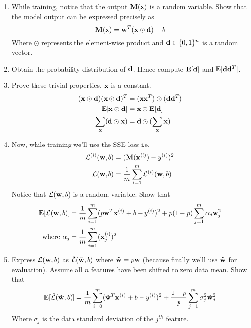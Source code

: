 \begin{enumerate}[label=\alph*)]

\item While training, notice that the output $\mathbf{M}(\mathbf{x})$ is a random variable. Show that the model output can be expressed precisely as
    \begin{equation*}
        \mathbf{M}(\mathbf{x}) = \mathbf{w}^T (\mathbf{x} \odot \mathbf{d}) + b
    \end{equation*}
Where  $\odot$ represents the element-wise product and $\mathbf{d} \in \{0, 1\}^n$ is a random vector.  

\item Obtain the probability distribution of $\mathbf{d}$. Hence compute $\mathbf{E}[\mathbf{d}]$ and $\mathbf{E}[\mathbf{d}\mathbf{d}^T]$.

\item Prove these trivial properties, $\mathbf{x}$  is a constant.
\begin{align*}
    (\mathbf{x} \odot \mathbf{d})  (\mathbf{x} \odot \mathbf{d})^T &=(\mathbf{x}\mathbf{x}^T) \odot (\mathbf{d}\mathbf{d}^T)\\
    \mathbf{E}[\mathbf{x} \odot \mathbf{d}] &= \mathbf{x}\odot \mathbf{E}[\mathbf{d}]\\
    \sum_{\mathbf{x}} (\mathbf{d} \odot \mathbf{x}) &= \mathbf{d} \odot (\sum_{\mathbf{x}} \mathbf{x})
\end{align*}

\item Now, while training we'll use the SSE loss i.e.
\begin{align*}
    \mathcal{L}^{(i)}(\mathbf{w}, b) &= (\mathbf{M}(\mathbf{x}^{(i)}) - y^{(i)})^2\\
    \mathcal{L}(\mathbf{w}, b) &= \frac{1}{m}\sum_{i = 1}^m  \mathcal{L}^{(i)}(\mathbf{w}, b)
\end{align*}
Notice that $\mathcal{L}(\mathbf{w}, b) $ is a random variable. Show that
\begin{align*}
    \mathbf{E}[\mathcal{L}(\mathbf{w}, b)] &= \frac{1}{m}\sum_{i = 1}^{m}(p\mathbf{w}^T \mathbf{x}^{(i)} + b - y^{(i)})^2 + p(1 - p)\sum_{j = 1}^m \alpha_j \mathbf{w}_j^2\\
    \text{where } \alpha_j &= \frac{1}{m}\sum_{i = 1}^{m} (\mathbf{x}_j^{(i)})^2
\end{align*}

\item 
Express  $\mathcal{L}(\mathbf{w}, b)$ as  $\Tilde{\mathcal{L}}(\Tilde{\mathbf{w}}, b)$ where $\Tilde{\mathbf{w}} = p \mathbf{w}$ (because finally we'll use $\Tilde{\mathbf{w}}$ for evaluation). Assume all $n$ features have been shifted to zero data mean. Show that
\begin{equation}\label{dropouts}
  \mathbf{E}[\Tilde{\mathcal{L}}(\Tilde{\mathbf{w}}, b)] = \frac{1}{m}\sum_{i = 0}^{m}(\Tilde{\mathbf{w}}^T \mathbf{x}^{(i)} + b - y^{(i)})^2 + \frac{1 - p}{p}\sum_{j = 1}^m \sigma_j^2 \Tilde{\mathbf{w}}_j^2\\
\end{equation}
Where $\sigma_j$ is the data standard deviation of the $j^{th}$ feature.


\end{enumerate}

